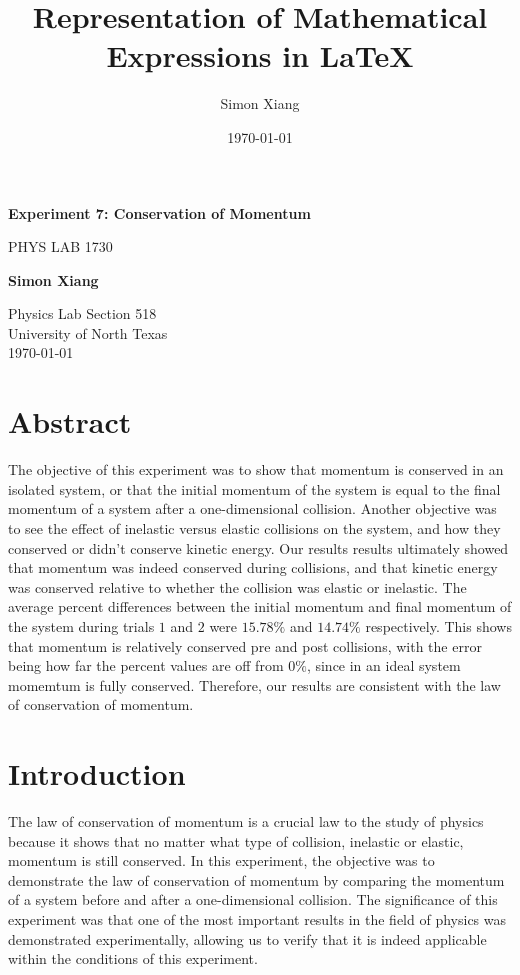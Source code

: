 \documentclass{article}
\title{Representation of Mathematical Expressions in \LaTeX}
\author{Simon Xiang}
\date{\today}
\theoremstyle{definition}
\begin{document}
\begin{titlepage}
    \begin{center}
        \vspace*{1cm}
 
        \Huge
        \textbf{Experiment 7: Conservation of Momentum}
 
        \vspace{0.5cm}
        \LARGE
        PHYS LAB 1730
 
        \vspace{1.5cm}
 
        \textbf{Simon Xiang}
 
        \vfill
  
        \vspace{0.8cm}
 
        \Large
        Physics Lab Section 518\\
        University of North Texas\\
        \today
 
    \end{center}
\end{titlepage}

\section{Abstract}
The objective of this experiment was to show that momentum is conserved in an isolated system, or that the 
initial momentum of the system is equal to the final momentum of a system after a one-dimensional collision.
Another objective was to see the effect of inelastic versus elastic collisions on the system, and how they conserved or
didn't conserve kinetic energy. 
Our results results ultimately showed that momentum was indeed conserved during collisions, and that 
kinetic energy was conserved relative to whether the collision was elastic or inelastic. The average
percent differences between the initial momentum and final momentum of the system during trials $1$ and $2$ were $15.78\%$
 and $14.74\%$ respectively. This shows that momentum is relatively conserved pre and post collisions, with the error
 being how far the percent values are off from $0\%$, since in an ideal system momemtum is fully conserved. Therefore,
 our results are consistent with the law of conservation of momentum.
\section{Introduction}
The law of conservation of momentum is a crucial law to the study of physics because it shows that no matter what type of collision, inelastic or elastic, momentum is still conserved. In this experiment, 
the objective was to demonstrate the law of conservation of momentum by comparing the momentum of a system before and after a one-dimensional collision.
The significance of this experiment was that one of the most important results in the field of physics was demonstrated experimentally, 
allowing us to verify that it is indeed applicable within the conditions of this experiment.
\end{document}

